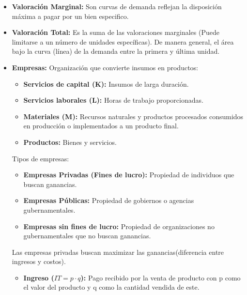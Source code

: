 \documentclass{templateNote}
\begin{document}
\begin{itemize}
\begin{figure}[H]
    \end{figure}

    \item \textbf{Valoración Marginal:} Son curvas de demanda reflejan la disposición máxima a pagar por un bien especifico.

    \item \textbf{Valoración Total:} Es la suma de las valoraciones marginales (Puede limitarse a un número de
    unidades específicas). De manera general, el área bajo la curva (línea) de la demanda entre la
    primera y última unidad.
    
    \newpage
    \item \textbf{Empresas:} Organización que convierte insumos en productos:
    \begin{itemize}
        \item \textbf{Servicios de capital (K):} Insumos de larga duración.
        
        \item \textbf{Servicios laborales (L):} Horas de trabajo proporcionadas.
        
        \item \textbf{Materiales (M):} Recursos naturales y productos procesados consumidos en producción o
        implementados a un producto final.
        
        \item \textbf{Productos:} Bienes y servicios.
    \end{itemize}

    Tipos de empresas:
    \begin{itemize}
        \item \textbf{Empresas Privadas (Fines de lucro):} Propiedad de individuos que buscan ganancias.
        
        \item \textbf{Empresas Públicas:} Propiedad de gobiernos o agencias gubernamentales.
        
        \item \textbf{Empresas sin fines de lucro:} Propiedad de organizaciones no gubernamentales que no
        buscan ganancias.        
    \end{itemize}

    Las empresas privadas buscan maximizar las ganancias(diferencia entre ingresos y costos).
    \begin{itemize}
        \item \textbf{Ingreso ($IT = p \cdot q$):} Pago recibido por la venta de producto con p como el valor del
        producto y q como la cantidad vendida de este.
        

\end{itemize}
\end{itemize}
\end{document}
